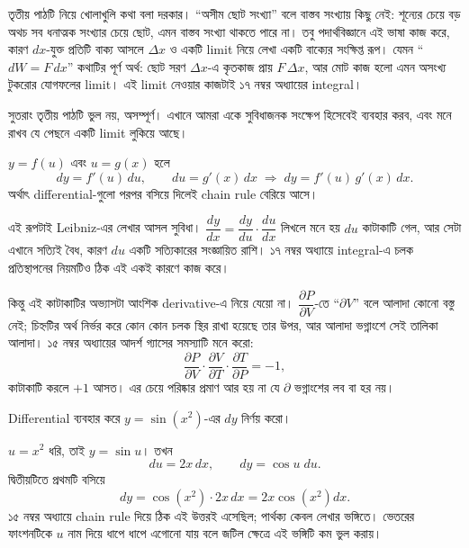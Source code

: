 \documentclass[11pt]{article}
\begin{document}
তৃতীয় পাঠটি নিয়ে খোলাখুলি কথা বলা দরকার। ``অসীম ছোট সংখ্যা'' বলে বাস্তব
সংখ্যায় কিছু নেই: শূন্যের চেয়ে বড় অথচ সব ধনাত্মক সংখ্যার চেয়ে ছোট, এমন
বাস্তব সংখ্যা থাকতে পারে না। তবু পদার্থবিজ্ঞানে এই ভাষা কাজ করে, কারণ
$dx$-যুক্ত প্রতিটি বাক্য আসলে $\Delta x$ ও একটি limit নিয়ে লেখা একটি বাক্যের
সংক্ষিপ্ত রূপ। যেমন ``$dW = F\,dx$'' কথাটির পূর্ণ অর্থ: ছোট সরণ $\Delta x$-এ
কৃতকাজ প্রায় $F\,\Delta x$, আর মোট কাজ হলো এমন অসংখ্য টুকরোর যোগফলের limit।
এই limit নেওয়ার কাজটাই ১৭ নম্বর অধ্যায়ের integral।

সুতরাং তৃতীয় পাঠটি ভুল নয়, অসম্পূর্ণ। এখানে আমরা একে সুবিধাজনক সংক্ষেপ
হিসেবেই ব্যবহার করব, এবং মনে রাখব যে পেছনে একটি limit লুকিয়ে আছে।

\begin{idea}
$y = f(u)$ এবং $u = g(x)$ হলে
\[
  dy = f'(u)\,du, \qquad du = g'(x)\,dx
  \;\Longrightarrow\;
  dy = f'(u)\,g'(x)\,dx .
\]
অর্থাৎ differential-গুলো পরপর বসিয়ে দিলেই chain rule বেরিয়ে আসে।
\end{idea}

এই রূপটাই Leibniz-এর লেখার আসল সুবিধা। $\dfrac{dy}{dx} = \dfrac{dy}{du}
\cdot \dfrac{du}{dx}$ লিখলে মনে হয় $du$ কাটাকাটি গেল, আর সেটা এখানে
সত্যিই বৈধ, কারণ $du$ একটি সত্যিকারের সংজ্ঞায়িত রাশি। ১৭ নম্বর অধ্যায়ে
integral-এ চলক প্রতিস্থাপনের নিয়মটিও ঠিক এই একই কারণে কাজ করে।

\begin{remark}
কিন্তু এই কাটাকাটির অভ্যাসটা আংশিক derivative-এ নিয়ে যেয়ো না।
$\dfrac{\partial P}{\partial V}$-তে ``$\partial V$'' বলে আলাদা কোনো বস্তু নেই;
চিহ্নটির অর্থ নির্ভর করে কোন কোন চলক স্থির রাখা হয়েছে তার উপর, আর আলাদা
ভগ্নাংশে সেই তালিকা আলাদা। ১৫ নম্বর অধ্যায়ের আদর্শ গ্যাসের সমস্যাটি মনে
করো:
\[
  \frac{\partial P}{\partial V} \cdot \frac{\partial V}{\partial T} \cdot
  \frac{\partial T}{\partial P} = -1 ,
\]
কাটাকাটি করলে $+1$ আসত। এর চেয়ে পরিষ্কার প্রমাণ আর হয় না যে
$\partial$ ভগ্নাংশের লব বা হর নয়।
\end{remark}

\begin{example}
Differential ব্যবহার করে $y = \sin\left( x^{2} \right)$-এর $dy$ নির্ণয় করো।
\end{example}

\begin{solbox}
$u = x^{2}$ ধরি, তাই $y = \sin u$। তখন
\[
  du = 2x\,dx, \qquad dy = \cos u \; du .
\]
দ্বিতীয়টিতে প্রথমটি বসিয়ে
\[
  dy = \cos\left( x^{2} \right) \cdot 2x\,dx = 2x\cos\left( x^{2} \right)dx .
\]
১৫ নম্বর অধ্যায়ে chain rule দিয়ে ঠিক এই উত্তরই এসেছিল; পার্থক্য কেবল
লেখার ভঙ্গিতে। ভেতরের ফাংশনটিকে $u$ নাম দিয়ে ধাপে ধাপে এগোনো যায় বলে জটিল
ক্ষেত্রে এই ভঙ্গিটি কম ভুল করায়।
\end{solbox}
\end{document}
